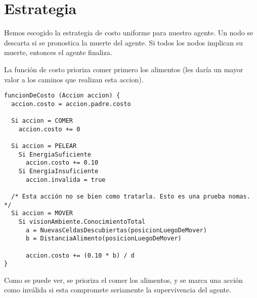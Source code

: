 \section{Estrategia}

Hemos escogido la estrategia de costo uniforme para nuestro agente. Un nodo se
descarta si se pronostica la muerte del agente. Si todos los nodos implican su
muerte, entonces el agente finaliza.

La función de costo prioriza comer primero los alimentos (les daría un mayor
valor a los caminos que realizan esta accion).

\begin{verbatim}
funcionDeCosto (Accion accion) {
  accion.costo = accion.padre.costo

  Si accion = COMER
    accion.costo += 0

  Si accion = PELEAR
    Si EnergiaSuficiente
      accion.costo += 0.10
    Si EnergiaInsuficiente
      accion.invalida = true

  /* Esta acción no se bien como tratarla. Esto es una prueba nomas. */
  Si accion = MOVER
    Si visionAmbiente.ConocimientoTotal
      a = NuevasCeldasDescubiertas(posicionLuegoDeMover)
      b = DistanciaAlimento(posicionLuegoDeMover)

      accion.costo += (0.10 * b) / d
}
\end{verbatim}

Como se puede ver, se prioriza el comer los alimentos, y se marca una acción
como inválida si esta compromete seriamente la supervivencia del agente.

